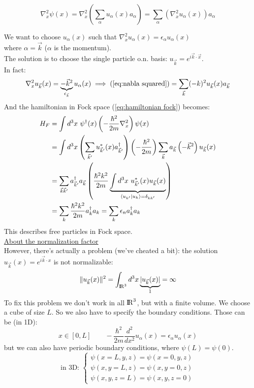 \begin{enumerate}[label=\roman*)]
    \begin{equation}\label{eq:nabla squared}
        \nabla^2_x \psi(x) = \nabla^2_x\left(\sum_\alpha u_\alpha(x) a_\alpha\right) = \sum_\alpha \left(\nabla^2_x u_\alpha(x)\right) a_\alpha    
    \end{equation}
    
    We want to choose $u_\alpha(x)$ such that $\nabla^2_x u_\alpha(x) = \epsilon_\alpha u_\alpha(x)$ \\
    where $\alpha = \vec k$ ($\alpha$ is the momentum).\\
    The solution is to choose the single particle o.n. basis: $u_{\vec k} = e^{i\vec k \cdot\vec x}$. \\
    In fact:
    $$ \nabla^2_x u_{\vec k}(x) = \underbrace{-{\vec k}^2}_{\epsilon_{\vec k}} u_\alpha(x) \implies (\ref{eq:nabla squared}) = \sum_{\vec k} (-k)^2 u_{\vec k}(x) a_{\vec k}$$
    And the hamiltonian in Fock space (\ref{eq:hamiltonian fock}) becomes:
    \begin{align*}
        H_F &= \int d^3x\ \psi^\dag(x) \left(-\frac{\hbar^2}{2m}\nabla^2_x\right) \psi(x)\\
        &= \int d^3x \left(\sum_{\vec k'} u^*_{\vec k'}(x) a^\dag_{\vec k'}\right) \left(-\frac{\hbar^2}{2m}\right) \sum_{\vec k} a_{\vec k} \left(-\vec k^2\right) u_{\vec k}(x)\\
        &= \sum_{\vec k \vec k'} a_{\vec k'}^\dag a_{\vec k} \left(\frac{\hbar^2 k^2}{2m} \underbrace{\int d^3 x\ u_{\vec k'}^*(x) u_{\vec k}(x)}_{\left\langle u_{k'} \middle| u_k \right\rangle = \delta_{kk'}}\right)\\
        &= \sum_{k} \frac{\hbar^2 k^2}{2m} a_k^\dag a_k = \sum_{k} {\epsilon_n} a_k^\dag a_k
    \end{align*}
    This describes free particles in Fock space.\\

    \underline{About the normalization factor}\\
    However, there's actually a problem (we've cheated a bit): the solution $u_{\vec k}(x) = e^{i\vec k\cdot x}$ is not normalizable:
    $$ \|u_{\vec k}(x)\|^2 = \int_{{\rm I\!R}^3} d^3x \underbrace{|u_{\vec k}(x)|}_1 = \infty$$
    To fix this problem we don't work in all ${\rm I\!R}^3$, but with a finite volume. We choose a cube of size $L$. So we also have to specify the boundary conditions. Those can be (in 1D): 
    $$x \in [0,L] \qquad -\frac {\hbar^2}{2m} \frac {d^2}{dx^2} u_\alpha(x) = \epsilon_\alpha u_\alpha(x)$$
    but we can also have periodic boundary conditions, where $\psi(L) = \psi(0)$.
    $$\text{in 3D: }\begin{cases}
        \psi(x = L,y,z) = \psi(x=0, y, z)\\
        \psi(x,y=L, z)= \psi(x,y=0,z)\\
        \psi(x,y,z=L)= \psi(x,y,z=0)
    \end{cases}$$


\end{enumerate}
